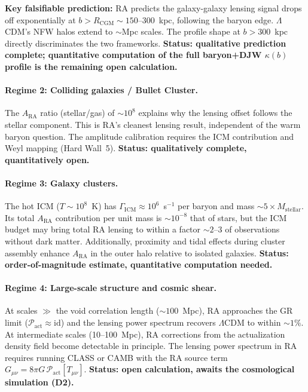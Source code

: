 \documentclass[11pt,a4paper]{article}
\theoremstyle{plain}
\theoremstyle{definition}
\theoremstyle{remark}
\newcommand{\Pact}{\mathcal{P}_{\mathrm{act}}}
\begin{document}
\textbf{Key falsifiable prediction:} RA predicts the galaxy-galaxy
lensing signal drops off exponentially at $b > R_{\mathrm{CGM}} \sim 150$--300~kpc,
following the baryon edge. $\Lambda$CDM's NFW halos extend to $\sim$Mpc scales.
The profile shape at $b > 300$~kpc directly discriminates the two frameworks.
\textbf{Status: qualitative prediction complete; quantitative computation
of the full baryon+DJW $\kappa(b)$ profile is the remaining open calculation.}

\paragraph{Regime 2: Colliding galaxies / Bullet Cluster.}
The $A_{\mathrm{RA}}$ ratio (stellar/gas) of $\sim 10^8$ explains
why the lensing offset follows the stellar component. This is RA's
cleanest lensing result, independent of the warm baryon question.
The amplitude calibration requires the ICM contribution and
Weyl mapping (Hard Wall~5). \textbf{Status: qualitatively complete,
quantitatively open.}

\paragraph{Regime 3: Galaxy clusters.}
The hot ICM ($T \sim 10^8$~K) has $\Gamma_{\mathrm{ICM}} \approx 10^6$~s$^{-1}$
per baryon and mass $\sim 5\times M_{\mathrm{stellar}}$. Its total $A_{\mathrm{RA}}$
contribution per unit mass is $\sim 10^{-8}$ that of stars, but the ICM budget
may bring total RA lensing to within a factor $\sim 2$--$3$ of observations
without dark matter. Additionally, proximity and tidal effects during cluster
assembly enhance $A_{\mathrm{RA}}$ in the outer halo relative to isolated
galaxies. \textbf{Status: order-of-magnitude estimate, quantitative
computation needed.}

\paragraph{Regime 4: Large-scale structure and cosmic shear.}
At scales $\gg$ the void correlation length ($\sim 100$~Mpc), RA approaches
the GR limit ($\Pact \approx \mathrm{id}$) and the lensing power spectrum
recovers $\Lambda$CDM to within $\sim 1\%$. At intermediate scales (10--100~Mpc),
RA corrections from the actualization density field become detectable in
principle. The lensing power spectrum in RA requires running CLASS or CAMB
with the RA source term $G_{\mu\nu} = 8\pi G\,\Pact[T_{\mu\nu}]$.
\textbf{Status: open calculation, awaits the cosmological simulation (D2).}
\end{document}
